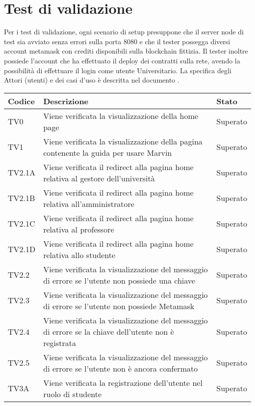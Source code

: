 \documentclass[PianoDiQualifica.tex]{subfiles}
\begin{document}
\chapter{Test di validazione}

Per i test di validazione, ogni scenario di setup presuppone che il server node di test sia avviato senza errori sulla porta 8080 e che il tester possegga diversi account metamask con crediti disponibili sulla blockchain fittizia.
Il tester inoltre possiede l’account che ha effettuato il deploy dei contratti sulla rete, avendo la possibilità di effettuare il login come utente Universitario.
La specifica degli Attori (utenti) e dei casi d’uso è descritta nel documento \adr \vrquattro.

\begin{longtable}[H]{P{2cm}P{8.5cm}P{3cm}}
	\color{CHeaderText}\textbf{Codice} & 
	\color{CHeaderText}\textbf{Descrizione} & 
	\color{CHeaderText}\textbf{Stato}\\
	\endhead
	TV0 & Viene verificata la visualizzazione della home page & Superato \\
	TV1 & Viene verificata la visualizzazione della pagina contenente la guida per usare Marvin & Superato \\
	TV2.1A & Viene verificata il redirect alla pagina home relativa al gestore dell'università & Superato \\
	TV2.1B & Viene verificata il redirect alla pagina home relativa all'amministratore & Superato \\
	TV2.1C & Viene verificata il redirect alla pagina home relativa al professore & Superato \\
	TV2.1D & Viene verificata il redirect alla pagina home relativa allo studente & Superato \\
	TV2.2 & Viene verificata la visualizzazione del messaggio di errore se l'utente non possiede una chiave & Superato \\ 
	TV2.3 & Viene verificata la visualizzazione del messaggio di errore se l'utente non possiede Metamask & Superato \\ 
	TV2.4 & Viene verificata la visualizzazione del messaggio di errore se la chiave dell'utente non è registrata & Superato \\ 
	TV2.5 & Viene verificata la visualizzazione del messaggio di errore se l'utente non è ancora confermato & Superato \\ 
	TV3A & Viene verificata la registrazione dell'utente nel ruolo di studente & Superato \\ 

\end{longtable}
\end{document}
